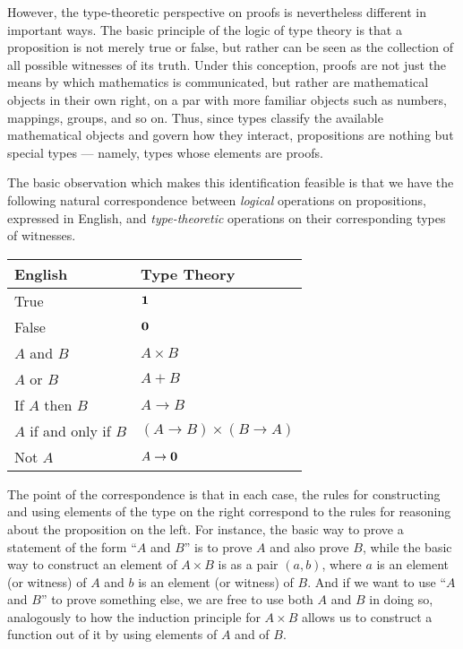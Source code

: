 However, the type-theoretic perspective on proofs is nevertheless different in important ways.
The basic principle of the logic of type theory is that a proposition is not merely true or false, but rather can be seen as the collection of all possible witnesses of its truth.
Under this conception, proofs are not just the means by which mathematics is communicated, but rather are mathematical objects in their own right, on a par with more familiar objects such as numbers, mappings, groups, and so on.
Thus, since types classify the available mathematical objects and govern how they interact, propositions are nothing but special  types --- namely, types whose elements are proofs.

%
%
The basic observation which makes this identification feasible is that we have the following natural correspondence between \emph{logical} operations on propositions, expressed in English, and \emph{type-theoretic} operations on their corresponding types of witnesses.
%
%
%
%
%
\begin{center}
\medskip
\begin{tabular}{ll}
  \toprule
  English & Type Theory\\
  \midrule
  True & $\mathbf{1}$ \\
  False & $\mathbf{0}$ \\
  $A$ and $B$ & $A \times B$ \\
  $A$ or $B$ & $A + B$ \\
  If $A$ then $B$ & $A \to B$ \\
  $A$ if and only if $B$ & $(A \to B) \times (B \to A)$ \\
  Not $A$ &  $A \to \mathbf{0}$ \\
  \bottomrule
\end{tabular}
\medskip
\end{center}

The point of the correspondence is that in each case, the rules for constructing and using elements of the type on the right correspond to the rules for reasoning about the proposition on the left.
For instance, the basic way to prove a statement of the form ``$A$ and $B$'' is to prove $A$ and also prove $B$, while the basic way to construct an element of $A\times B$ is as a pair $(a,b)$, where $a$ is an element (or witness) of $A$ and $b$ is an element (or witness) of $B$.
And if we want to use ``$A$ and $B$'' to prove something else, we are free to use both $A$ and $B$ in doing so, analogously to how the induction principle for $A\times B$ allows us to construct a function out of it by using elements of $A$ and of $B$.


